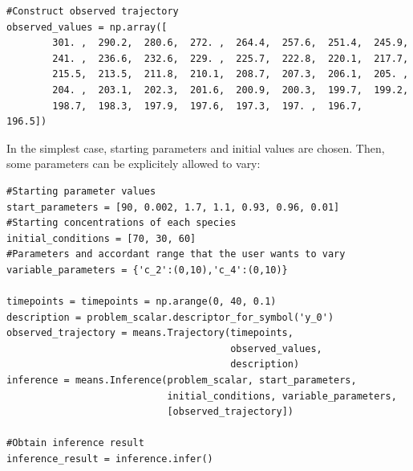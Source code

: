 \begin{framed}
\begin{verbatim}
#Construct observed trajectory
observed_values = np.array([ 
        301. ,  290.2,  280.6,  272. ,  264.4,  257.6,  251.4,  245.9,
        241. ,  236.6,  232.6,  229. ,  225.7,  222.8,  220.1,  217.7,
        215.5,  213.5,  211.8,  210.1,  208.7,  207.3,  206.1,  205. ,
        204. ,  203.1,  202.3,  201.6,  200.9,  200.3,  199.7,  199.2,
        198.7,  198.3,  197.9,  197.6,  197.3,  197. ,  196.7,  196.5])

\end{verbatim}
\end{framed}

In the simplest case, starting parameters and initial values are chosen.
Then, some parameters can be explicitely allowed to vary:

\begin{framed}
\begin{verbatim}
#Starting parameter values
start_parameters = [90, 0.002, 1.7, 1.1, 0.93, 0.96, 0.01]
#Starting concentrations of each species
initial_conditions = [70, 30, 60]
#Parameters and accordant range that the user wants to vary
variable_parameters = {'c_2':(0,10),'c_4':(0,10)}
        
timepoints = timepoints = np.arange(0, 40, 0.1)
description = problem_scalar.descriptor_for_symbol('y_0')
observed_trajectory = means.Trajectory(timepoints,
                                       observed_values,
                                       description)
inference = means.Inference(problem_scalar, start_parameters, 
                            initial_conditions, variable_parameters, 
                            [observed_trajectory])

#Obtain inference result
inference_result = inference.infer()
\end{verbatim}
\end{framed}




